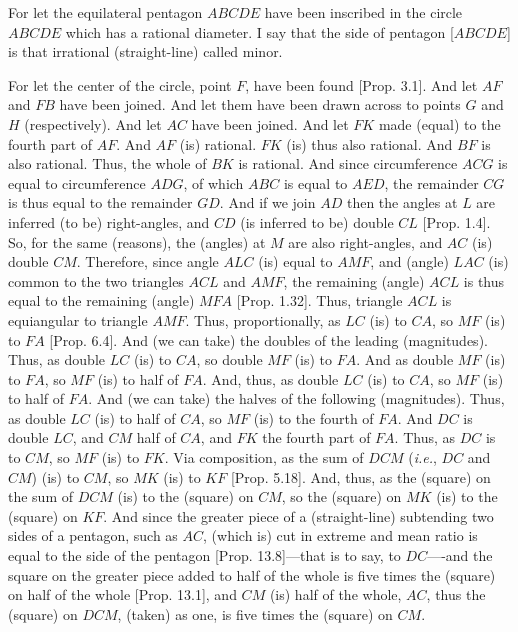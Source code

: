 \begin{Parallel}{}{}
{For let the equilateral pentagon $ABCDE$ have been inscribed  in the circle $ABCDE$ which has a rational diameter. I say that the side of pentagon
[$ABCDE$] is that irrational (straight-line) called minor.

For let the center of the circle, point $F$, have been found [Prop. 3.1].
And let $AF$ and $FB$ have been joined. And let them have been drawn
across to points $G$ and $H$ (respectively). And let $AC$ have been joined.
And let $FK$ made (equal) to the fourth part of $AF$. And $AF$ (is) rational. $FK$ (is) thus also rational. And $BF$ is also rational. Thus,
the whole of $BK$ is rational. And since circumference $ACG$ is equal
to circumference $ADG$, of which $ABC$ is equal to $AED$, the
remainder $CG$ is thus equal to the remainder $GD$.
And if we join $AD$ then the angles at $L$ are inferred (to be) right-angles, 
and $CD$ (is inferred to be) double $CL$ [Prop. 1.4].  So, for the same (reasons), 
the (angles) at $M$ are also right-angles, and $AC$ (is) double $CM$. Therefore,
since angle $ALC$ (is) equal to $AMF$, and (angle) $LAC$ (is) common
to the two triangles $ACL$ and $AMF$, the remaining (angle) $ACL$ is thus
equal to the remaining (angle) $MFA$ [Prop. 1.32]. Thus, triangle 
$ACL$  is equiangular to triangle $AMF$. Thus, proportionally, 
as $LC$ (is) to $CA$, so $MF$ (is) to $FA$ [Prop. 6.4]. And (we can take) the
doubles of the leading (magnitudes). Thus, as double $LC$ (is) to $CA$,
so double $MF$ (is) to $FA$. And as double $MF$ (is) to $FA$, so
$MF$ (is) to half of $FA$. And, thus, as double $LC$ (is) to $CA$,
so $MF$ (is) to half of $FA$. And (we can take) the halves of the following
(magnitudes). Thus, as double $LC$ (is) to half of $CA$, so $MF$
(is) to the fourth of $FA$. And $DC$ is double $LC$, and  $CM$ half
of $CA$, and $FK$ the fourth part of $FA$.  Thus, as $DC$
is to $CM$, so $MF$ (is) to $FK$. Via composition, as the
sum of $DCM$ ({\em i.e.}, $DC$ and $CM$)
(is) to $CM$, so $MK$ (is) to $KF$ [Prop. 5.18]. And, thus, as the (square) on the
sum of $DCM$ (is) to the (square) on $CM$, so the (square) on $MK$
(is) to the (square) on $KF$. And since the
greater piece of a (straight-line) subtending two sides of a
pentagon, such as $AC$, (which is) cut in extreme and mean ratio is equal to the side of the pentagon [Prop. 13.8]---that is to say,
to $DC$----and the square on the greater piece added to half of the
whole is five times the (square) on half of the whole [Prop. 13.1], 
and $CM$ (is) half of the whole, $AC$, thus the (square) on
$DCM$, (taken) as one, is five times the (square) on $CM$.
}
\end{Parallel}
